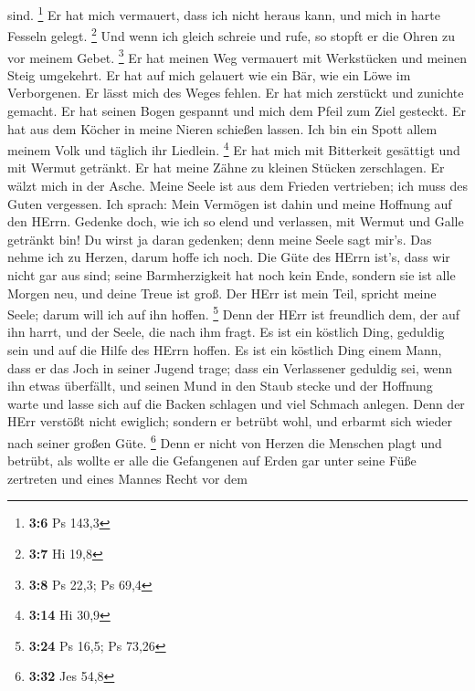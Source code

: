 sind. \footnote{\textbf{3:6} Ps 143,3}  Er hat mich
vermauert, dass ich nicht heraus kann, und mich in harte Fesseln gelegt.
\footnote{\textbf{3:7} Hi 19,8}  Und wenn ich gleich schreie
und rufe, so stopft er die Ohren zu vor meinem Gebet. \footnote{\textbf{3:8}
  Ps 22,3; Ps 69,4}  Er hat meinen Weg vermauert mit
Werkstücken und meinen Steig umgekehrt.  Er hat auf mich
gelauert wie ein Bär, wie ein Löwe im Verborgenen.  Er
lässt mich des Weges fehlen. Er hat mich zerstückt und zunichte gemacht.
 Er hat seinen Bogen gespannt und mich dem Pfeil zum Ziel
gesteckt.  Er hat aus dem Köcher in meine Nieren schießen
lassen.  Ich bin ein Spott allem meinem Volk und täglich
ihr Liedlein. \footnote{\textbf{3:14} Hi 30,9}  Er hat mich
mit Bitterkeit gesättigt und mit Wermut getränkt.  Er hat
meine Zähne zu kleinen Stücken zerschlagen. Er wälzt mich in der Asche.
 Meine Seele ist aus dem Frieden vertrieben; ich muss des
Guten vergessen.  Ich sprach: Mein Vermögen ist dahin und
meine Hoffnung auf den HErrn.  Gedenke doch, wie ich so
elend und verlassen, mit Wermut und Galle getränkt bin!  Du
wirst ja daran gedenken; denn meine Seele sagt mir's.  Das
nehme ich zu Herzen, darum hoffe ich noch.  Die Güte des
HErrn ist's, dass wir nicht gar aus sind; seine Barmherzigkeit hat noch
kein Ende,  sondern sie ist alle Morgen neu, und deine
Treue ist groß.  Der HErr ist mein Teil, spricht meine
Seele; darum will ich auf ihn hoffen. \footnote{\textbf{3:24} Ps 16,5;
  Ps 73,26}  Denn der HErr ist freundlich dem, der auf ihn
harrt, und der Seele, die nach ihm fragt.  Es ist ein
köstlich Ding, geduldig sein und auf die Hilfe des HErrn hoffen.
 Es ist ein köstlich Ding einem Mann, dass er das Joch in
seiner Jugend trage;  dass ein Verlassener geduldig sei,
wenn ihn etwas überfällt,  und seinen Mund in den Staub
stecke und der Hoffnung warte  und lasse sich auf die
Backen schlagen und viel Schmach anlegen.  Denn der HErr
verstößt nicht ewiglich;  sondern er betrübt wohl, und
erbarmt sich wieder nach seiner großen Güte. \footnote{\textbf{3:32} Jes
  54,8}  Denn er nicht von Herzen die Menschen plagt und
betrübt,  als wollte er alle die Gefangenen auf Erden gar
unter seine Füße zertreten  und eines Mannes Recht vor dem
